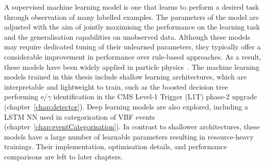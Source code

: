 A supervised machine learning model is one that learns to perform a desired task through observation of many labelled examples. The parameters of the model are adjusted with the aim of jointly maximising the performance on the learning task and the generalisation capabilities on unobserved data. Although these models may require dedicated tuning of their unlearned parameters, they typically offer a considerable improvement in performance over rule-based approaches. As a result, these models have been widely applied in particle physics~\cite{ml_in_hep}. The machine learning models trained in this thesis include shallow learning architectures, which are interpretable and lightweight to train, such as the boosted decision tree performing e/$\gamma$ identification in the CMS Level-1 Trigger (L1T) phase-2 upgrade (chapter~\ref{chap:detector}). Deep learning models are also explored, including a LSTM NN used in categorisation of VBF \Hee events (chapter~\ref{chap:eventCategorisation}). In contrast to shallower architectures, these models have a large number of learnable parameters resulting in resource-heavy trainings. Their implementation, optimisation details, and performance comparisons are left to later chapters.
